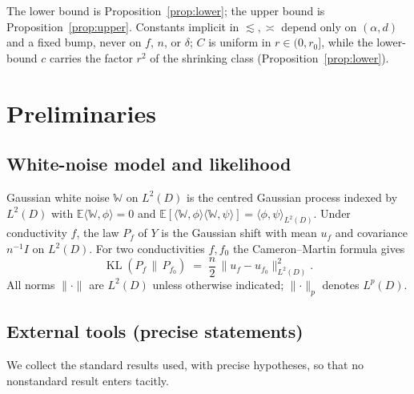 \documentclass[11pt]{article}
\theoremstyle{remark}
\newcommand{\E}{\mathbb{E}}
\newcommand{\W}{\mathbb{W}}
\newcommand{\norm}[1]{\lVert #1\rVert}
\newcommand{\inner}[2]{\langle #1,#2\rangle}
\begin{document}
\noindent The lower bound is Proposition~\ref{prop:lower}; the upper bound
is Proposition~\ref{prop:upper}. Constants implicit in $\lesssim,\asymp$ depend only on
$(\alpha,d)$ and a fixed bump, never on $f$, $n$, or $\delta$; $C$ is
uniform in $r\in(0,r_0]$, while the lower-bound $c$ carries the factor
$r^{2}$ of the shrinking class (Proposition~\ref{prop:lower}).

\section{Preliminaries}\label{sec:prelim}

\subsection{White-noise model and likelihood}
Gaussian white noise $\W$ on $L^{2}(D)$ is the centred Gaussian process
indexed by $L^{2}(D)$ with
$\E\inner{\W}{\phi}=0$ and
$\E[\inner{\W}{\phi}\inner{\W}{\psi}]=\inner{\phi}{\psi}_{L^{2}(D)}$. Under
conductivity $f$, the law $P_{f}$ of $Y$ is the Gaussian shift with mean
$u_{f}$ and covariance $n^{-1}I$ on $L^{2}(D)$. For two conductivities
$f,f_0$ the Cameron--Martin formula gives
\begin{equation}\label{eq:KL}
\operatorname{KL}(P_{f}\,\|\,P_{f_{0}})
\;=\;\frac{n}{2}\,\norm{u_{f}-u_{f_{0}}}_{L^{2}(D)}^{2}.
\end{equation}
All norms $\norm{\cdot}$ are $L^{2}(D)$ unless otherwise indicated;
$\norm{\cdot}_{p}$ denotes $L^{p}(D)$.

\subsection{External tools (precise statements)}
We collect the standard results used, with precise hypotheses, so that no
nonstandard result enters tacitly.
\end{document}
